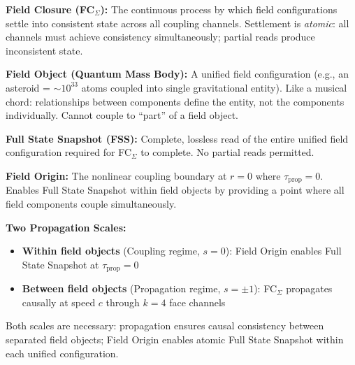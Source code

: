 \documentclass[aps,prd,preprint,superscriptaddress,showpacs,preprintnumbers,amsmath,amssymb,nofootinbib]{revtex4-2}
\begin{document}
\vspace{1em}
\begin{tcolorbox}[colback=blue!5!white,colframe=blue!75!black,title=\textbf{Key Concepts: Field Closure and Two-Scale Dynamics}]

\textbf{Field Closure (FC$_{\Sigma}$):} The continuous process by which field configurations settle into consistent state across all coupling channels. Settlement is \emph{atomic}: all channels must achieve consistency simultaneously; partial reads produce inconsistent state.

\vspace{0.5em}

\textbf{Field Object (Quantum Mass Body):} A unified field configuration (e.g., an asteroid = $\sim 10^{33}$ atoms coupled into single gravitational entity). Like a musical chord: relationships between components define the entity, not the components individually. Cannot couple to ``part'' of a field object.

\vspace{0.5em}

\textbf{Full State Snapshot (FSS):} Complete, lossless read of the entire unified field configuration required for FC$_{\Sigma}$ to complete. No partial reads permitted.

\vspace{0.5em}

\textbf{Field Origin:} The nonlinear coupling boundary at $r = 0$ where $\tau_{\text{prop}} = 0$. Enables Full State Snapshot within field objects by providing a point where all field components couple simultaneously.

\vspace{0.5em}

\textbf{Two Propagation Scales:}
\begin{itemize}[leftmargin=*,itemsep=2pt]
\item \textbf{Within field objects} (Coupling regime, $s = 0$): Field Origin enables Full State Snapshot at $\tau_{\text{prop}} = 0$
\item \textbf{Between field objects} (Propagation regime, $s = \pm 1$): FC$_{\Sigma}$ propagates causally at speed $c$ through $k = 4$ face channels
\end{itemize}

\vspace{0.3em}

Both scales are necessary: propagation ensures causal consistency between separated field objects; Field Origin enables atomic Full State Snapshot within each unified configuration.

\end{tcolorbox}
\vspace{1em}
\end{document}
